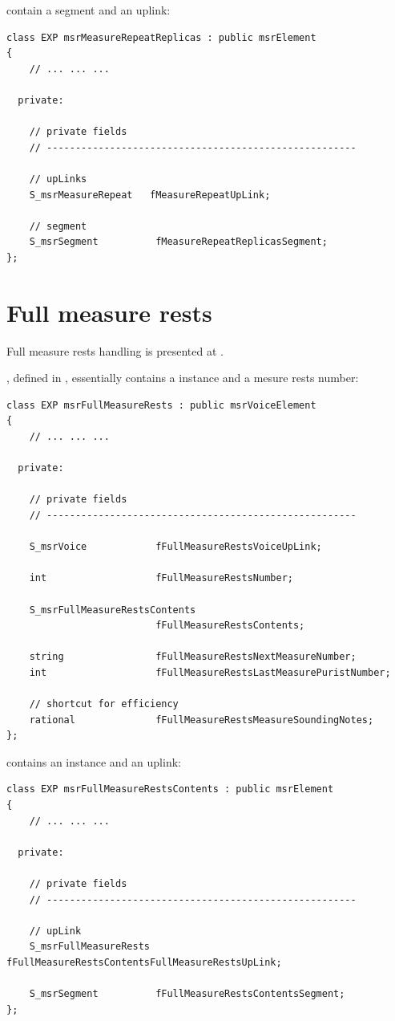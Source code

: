  contain a segment and an uplink:
\begin{lstlisting}[language=CPlusPlus]
class EXP msrMeasureRepeatReplicas : public msrElement
{
	// ... ... ...

  private:

    // private fields
    // ------------------------------------------------------

    // upLinks
    S_msrMeasureRepeat   fMeasureRepeatUpLink;

    // segment
    S_msrSegment          fMeasureRepeatReplicasSegment;
};
\end{lstlisting}


\section{Full measure rests}\label{Full measure rests}

Full measure rests handling is presented at .

, defined in , essentially contains a  instance and a mesure rests number:
\begin{lstlisting}[language=CPlusPlus]
class EXP msrFullMeasureRests : public msrVoiceElement
{
	// ... ... ...

  private:

    // private fields
    // ------------------------------------------------------

    S_msrVoice            fFullMeasureRestsVoiceUpLink;

    int                   fFullMeasureRestsNumber;

    S_msrFullMeasureRestsContents
                          fFullMeasureRestsContents;

    string                fFullMeasureRestsNextMeasureNumber;
    int                   fFullMeasureRestsLastMeasurePuristNumber;

    // shortcut for efficiency
    rational              fFullMeasureRestsMeasureSoundingNotes;
};
\end{lstlisting}

 contains an  instance and an uplink:
\begin{lstlisting}[language=CPlusPlus]
class EXP msrFullMeasureRestsContents : public msrElement
{
	// ... ... ...

  private:

    // private fields
    // ------------------------------------------------------

    // upLink
    S_msrFullMeasureRests fFullMeasureRestsContentsFullMeasureRestsUpLink;

    S_msrSegment          fFullMeasureRestsContentsSegment;
};
\end{lstlisting}


